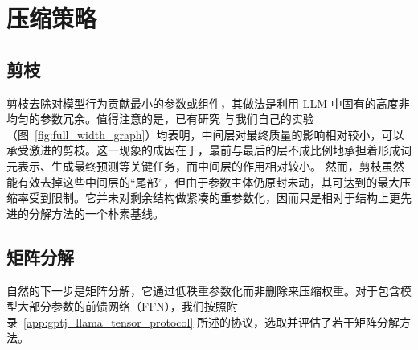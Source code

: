 \section{压缩策略}
\label{sec:compression}

\subsection{剪枝}

剪枝去除对模型行为贡献最小的参数或组件，其做法是利用 LLM 中固有的高度非均匀的参数冗余。值得注意的是，已有研究 \citep{unreasonable_ineffectiveness_2024} 与我们自己的实验（图~\ref{fig:full_width_graph}）均表明，中间层对最终质量的影响相对较小，可以承受激进的剪枝。这一现象的成因在于，最前与最后的层不成比例地承担着形成词元表示、生成最终预测等关键任务，而中间层的作用相对较小。
然而，剪枝虽然能有效去掉这些中间层的“尾部”，但由于参数主体仍原封未动，其可达到的最大压缩率受到限制。它并未对剩余结构做紧凑的重参数化，因而只是相对于结构上更先进的分解方法的一个朴素基线。




\subsection{矩阵分解}


自然的下一步是矩阵分解，它通过低秩重参数化而非删除来压缩权重。对于包含模型大部分参数的前馈网络（FFN）\citep{FFNs_Are_Memory_2021}，我们按照附录~\ref{app:gptj_llama_tensor_protocol} 所述的协议，选取并评估了若干矩阵分解方法。


